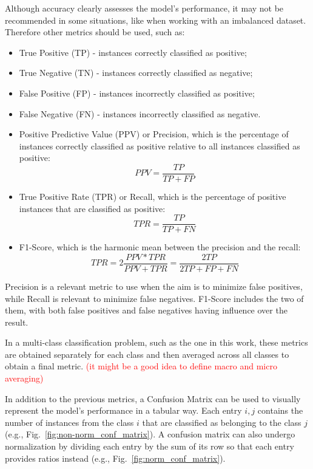 Although accuracy clearly assesses the model's performance, it may not be recommended in some situations, like when working with an imbalanced dataset. Therefore other metrics should be used, such as:

\begin{itemize}
    \item True Positive (TP) - instances correctly classified as positive;
    \item True Negative (TN) - instances correctly classified as negative;
    \item False Positive (FP) - instances incorrectly classified as positive;
    \item False Negative (FN) - instances incorrectly classified as negative.
    \item Positive Predictive Value (PPV) or Precision, which is the percentage of instances correctly classified as positive relative to all instances classified as positive: \begin{equation}PPV=\frac{TP}{TP+FP}\label{eq:ppv}\end{equation}
    \item True Positive Rate (TPR) or Recall, which is the percentage of positive instances that are classified as positive: \begin{equation}TPR=\frac{TP}{TP+FN}\label{eq:tpr}\end{equation}
    \item F1-Score, which is the harmonic mean between the precision and the recall: \begin{equation}TPR=2\frac{PPV*TPR}{PPV+TPR}=\frac{2TP}{2TP+FP+FN}\label{eq:f1-score}\end{equation}
\end{itemize}

Precision is a relevant metric to use when the aim is to minimize false positives, while Recall is relevant to minimize false negatives. F1-Score includes the two of them, with both false positives and false negatives having influence over the result.

In a multi-class classification problem, such as the one in this work, these metrics are obtained separately for each class and then averaged across all classes to obtain a final metric. \textcolor{red}{(it might be a good idea to define macro and micro averaging)}

In addition to the previous metrics, a Confusion Matrix can be used to visually represent the model's performance in a tabular way. Each entry $i,j$ contains the number of instances from the class $i$ that are classified as belonging to the class $j$ (e.g., Fig.~\ref{fig:non-norm_conf_matrix}). A confusion matrix can also undergo normalization by dividing each entry by the sum of its row so that each entry provides ratios instead (e.g., Fig.~\ref{fig:norm_conf_matrix}).

